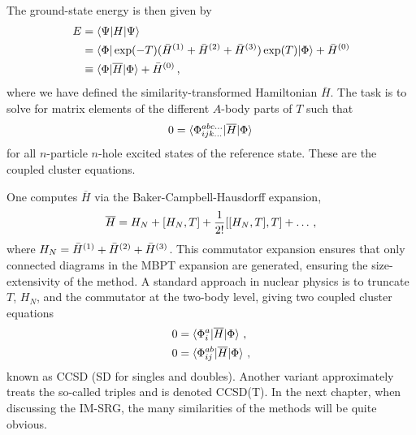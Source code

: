 The ground-state energy is then given by
\begin{align}
  E &= \braket{\Psi | H | \Psi} \\
  &= \braket{\Phi | \exp(-T) ({\bar{H}}^{(1)} + {\bar{H}}^{(2)} + {\bar{H}}^{(3)}) \exp(T) | \Phi} + {\bar{H}}^{(0)} \\
  &\equiv \braket{\Phi | \overline{H} | \Phi} + {\bar{H}}^{(0)}\,,
\end{align}
where we have defined the similarity-transformed Hamiltonian $\overline{H}$.
The task is to solve for matrix elements of the different $A$-body parts of $T$
such that
\begin{equation}
  0 = \braket{\Phi_{ijk\ldots}^{abc\ldots} | \overline{H} | \Phi}\,
\end{equation}
for all $n$-particle $n$-hole excited states of the reference state.
These are the coupled cluster equations.

One computes $\overline{H}$ via the Baker-Campbell-Hausdorff expansion,
\begin{equation}
  \overline{H} = H_N + [H_N, T] + \frac{1}{2!} [[H_N, T], T] + \ldots \,,
\end{equation}
where $H_N={\bar{H}}^{(1)} + {\bar{H}}^{(2)} + {\bar{H}}^{(3)}$.
This commutator expansion ensures that only connected diagrams in the MBPT expansion are generated,
ensuring the size-extensivity of the method.
A standard approach in nuclear physics is to truncate $T$, $H_N$, and the commutator
at the two-body level,
giving two coupled cluster equations
\begin{align}
  0 &= \braket{\Phi_{i}^{a} | \overline{H} | \Phi}\,,\\
  0 &= \braket{\Phi_{ij}^{ab} | \overline{H} | \Phi}\,,
\end{align}
known as CCSD (SD for singles and doubles).
Another variant approximately treats the so-called triples and is denoted CCSD(T).\@
In the next chapter, when discussing the IM-SRG,
the many similarities of the methods will be quite obvious.

